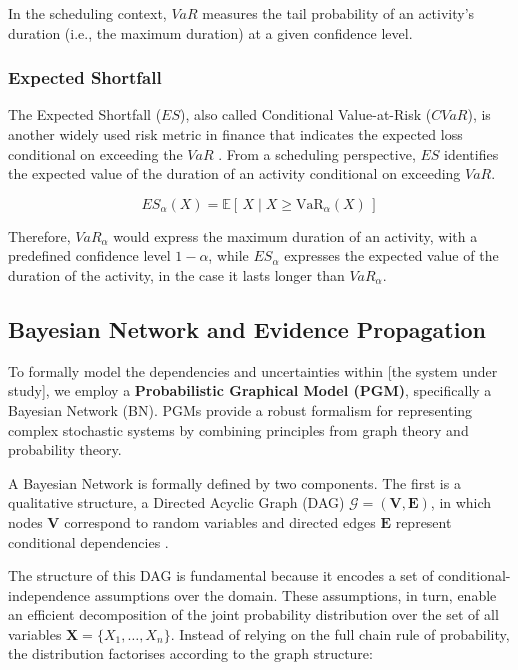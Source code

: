 In the scheduling context, $VaR$ measures the tail probability of an activity's duration (i.e., the maximum duration) at a given confidence level. 

\subsubsection{Expected Shortfall}
The Expected Shortfall ($ES$), also called Conditional Value-at-Risk ($CVaR$), is another widely used risk metric in finance that indicates the expected loss conditional on exceeding the $VaR$ \citep{Artzner1999, Acerbi2002}. From a scheduling perspective, $ES$ identifies the expected value of the duration of an activity conditional on exceeding $VaR$. 

\begin{equation}
ES_{\alpha}(X) = \mathbb{E}\!\left[\, X \mid X \ge \text{VaR}_{\alpha}(X) \,\right]
\end{equation}

Therefore, $VaR_{\alpha}$ would express the maximum duration of an activity, with a predefined confidence level $1-\alpha$, while $ES_{\alpha}$ expresses the expected value of the duration of the activity, in the case it lasts longer than $VaR_{\alpha}$.

\subsection{Bayesian Network and Evidence Propagation}

To formally model the dependencies and uncertainties within [the system under study], we employ a \textbf{Probabilistic Graphical Model (PGM)}, specifically a Bayesian Network (BN). PGMs provide a robust formalism for representing complex stochastic systems by combining principles from graph theory and probability theory.

A Bayesian Network is formally defined by two components. The first is a qualitative structure, a Directed Acyclic Graph (DAG) $\mathcal{G} = (\mathbf{V}, \mathbf{E})$, in which nodes $\mathbf{V}$ correspond to random variables and directed edges $\mathbf{E}$ represent conditional dependencies \citep{caetano2024resilience}. 

The structure of this DAG is fundamental because it encodes a set of conditional-independence assumptions over the domain. These assumptions, in turn, enable an efficient decomposition of the joint probability distribution over the set of all variables $\mathbf{X} = \{X_1, \dots, X_n\}$. Instead of relying on the full chain rule of probability, the distribution factorises according to the graph structure:

